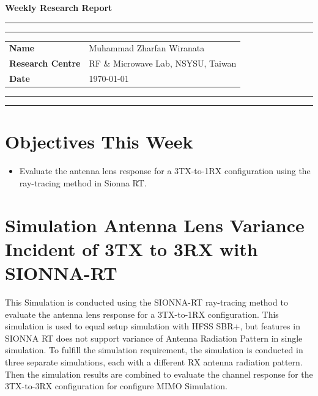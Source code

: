 \documentclass[10pt]{article}
\newcommand{\studentname}{Muhammad Zharfan Wiranata}
\newcommand{\researchcentre}{RF \& Microwave Lab, NSYSU, Taiwan}
\newcommand{\projecttitle}{Basic FMCW Radar}
\newcommand{\supervisor}{Dr A. N. Other}
\begin{document}

\begin{center}
    {\Huge\bfseries Weekly Research Report} \\[2mm]
\end{center}

\vspace{4mm}
\hrule
\vspace{1mm}
\hrule

\vspace{3mm}
\begin{tabular}{ll}
    \textbf{Name}              & \studentname \\
    \textbf{Research Centre}   & \researchcentre \\
    \textbf{Date}              & \today \\
\end{tabular}

\vspace{3mm}
\hrule
\vspace{1mm}
\hrule

\section{Objectives This Week}
\begin{itemize}
    \item Evaluate the antenna lens response for a 3TX-to-1RX configuration using the ray-tracing method in Sionna RT.
\end{itemize}

\section{Simulation Antenna Lens Variance Incident of 3TX to 3RX with SIONNA-RT}
This Simulation is conducted using the SIONNA-RT ray-tracing method to evaluate the antenna lens response for a 3TX-to-1RX configuration. This simulation is used to equal setup simulation with HFSS SBR+, but features in SIONNA RT does not support variance of Antenna Radiation Pattern in single simulation. To fulfill the simulation requirement, the simulation is conducted in three separate simulations, each with a different RX antenna radiation pattern. Then the simulation results are combined to evaluate the channel response for the 3TX-to-3RX configuration for configure MIMO Simulation.
\end{document}
